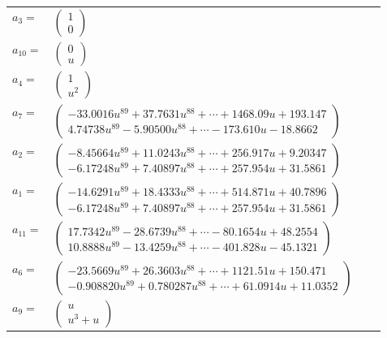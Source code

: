 \documentclass[1p]{elsarticle_modified}
\theoremstyle{definition}
\begin{document}
\begin{tabular}{m{7pt} m{180pt} m{7pt} m{180pt} }
\flushright $a_{3}=$&$\begin{pmatrix}1\\0\end{pmatrix}$ \\
\flushright $a_{10}=$&$\begin{pmatrix}0\\u\end{pmatrix}$ \\
\flushright $a_{4}=$&$\begin{pmatrix}1\\u^2\end{pmatrix}$ \\
\flushright $a_{7}=$&$\begin{pmatrix}-33.0016 u^{89}+37.7631 u^{88}+\cdots+1468.09 u+193.147\\4.74738 u^{89}-5.90500 u^{88}+\cdots-173.610 u-18.8662\end{pmatrix}$ \\
\flushright $a_{2}=$&$\begin{pmatrix}-8.45664 u^{89}+11.0243 u^{88}+\cdots+256.917 u+9.20347\\-6.17248 u^{89}+7.40897 u^{88}+\cdots+257.954 u+31.5861\end{pmatrix}$ \\
\flushright $a_{1}=$&$\begin{pmatrix}-14.6291 u^{89}+18.4333 u^{88}+\cdots+514.871 u+40.7896\\-6.17248 u^{89}+7.40897 u^{88}+\cdots+257.954 u+31.5861\end{pmatrix}$ \\
\flushright $a_{11}=$&$\begin{pmatrix}17.7342 u^{89}-28.6739 u^{88}+\cdots-80.1654 u+48.2554\\10.8888 u^{89}-13.4259 u^{88}+\cdots-401.828 u-45.1321\end{pmatrix}$ \\
\flushright $a_{6}=$&$\begin{pmatrix}-23.5669 u^{89}+26.3603 u^{88}+\cdots+1121.51 u+150.471\\-0.908820 u^{89}+0.780287 u^{88}+\cdots+61.0914 u+11.0352\end{pmatrix}$ \\
\flushright $a_{9}=$&$\begin{pmatrix}u\\u^3+u\end{pmatrix}$ \\

\end{tabular}
\end{document}
